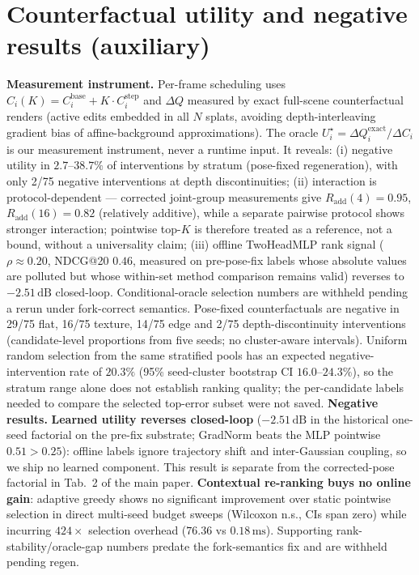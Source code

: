 \documentclass[10pt,twocolumn,letterpaper]{article}
\begin{document}
\section{Counterfactual utility and negative results (auxiliary)}
\textbf{Measurement instrument.} Per-frame scheduling uses $C_i(K) = C_i^{\mathrm{base}} + K \cdot C_i^{\mathrm{step}}$ and $\Delta Q$ measured by exact full-scene counterfactual renders (active edits embedded in all $N$ splats, avoiding depth-interleaving gradient bias of affine-background approximations).
The oracle $U_i^\star = \Delta Q_i^{\mathrm{exact}} / \Delta C_i$ is our measurement instrument, never a runtime input.
It reveals: (i) negative utility in $2.7$--$38.7\%$ of interventions by stratum (pose-fixed regeneration), with only 2/75 negative interventions at depth discontinuities; (ii) interaction is protocol-dependent --- corrected joint-group measurements give $R_{\mathrm{add}}(4) = 0.95$, $R_{\mathrm{add}}(16) = 0.82$ (relatively additive), while a separate pairwise protocol shows stronger interaction; pointwise top-$K$ is therefore treated as a reference, not a bound, without a universality claim; (iii) offline TwoHeadMLP rank signal ($\rho \approx 0.20$, NDCG@20 $0.46$, measured on pre-pose-fix labels whose absolute values are polluted but whose within-set method comparison remains valid) reverses to $-2.51\,\mathrm{dB}$ closed-loop. Conditional-oracle selection numbers are withheld pending a rerun under fork-correct semantics.
Pose-fixed counterfactuals are negative in 29/75 flat, 16/75 texture, 14/75 edge and 2/75 depth-discontinuity interventions (candidate-level proportions from five seeds; no cluster-aware intervals). Uniform random selection from the same stratified pools has an expected negative-intervention rate of $20.3\%$ (95\% seed-cluster bootstrap CI $16.0$--$24.3\%$), so the stratum range alone does not establish ranking quality; the per-candidate labels needed to compare the selected top-error subset were not saved.
\textbf{Negative results.}
\textbf{Learned utility reverses closed-loop} ($-2.51\,\mathrm{dB}$ in the historical one-seed factorial on the pre-fix substrate; GradNorm beats the MLP pointwise $0.51 > 0.25$): offline labels ignore trajectory shift and inter-Gaussian coupling, so we ship no learned component. This result is separate from the corrected-pose factorial in Tab.~2 of the main paper.
\textbf{Contextual re-ranking buys no online gain}: adaptive greedy shows no significant improvement over static pointwise selection in direct multi-seed budget sweeps (Wilcoxon n.s., CIs span zero) while incurring $424\times$ selection overhead ($76.36$ vs $0.18\,\mathrm{ms}$). Supporting rank-stability/oracle-gap numbers predate the fork-semantics fix and are withheld pending regen.
\end{document}
